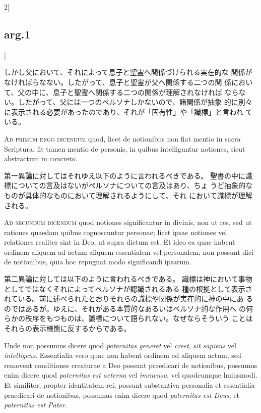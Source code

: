 \documentclass[paper=a4paper,fontsize=10pt,jafontsize=9pt,titlepage]{jlreq}
\begin{document}
\begin{paracol}{2}[\subsection{arg.1}]
\switchcolumn

しかし父において、それによって息子と聖霊へ関係づけられる実在的な
 関係がなければらなない。したがって、息子と聖霊が父へ関係する二つの関
 係において、父の中に、息子と聖霊へ関係する二つの関係が理解されなければ
 ならない。したがって、父には一つのペルソナしかないので、諸関係が抽象
 的に別々に表示される必要があったのであり、それが「固有性」や「識標」と言われ
 ている。

\switchcolumn*[\subsection{ad.1}]

{\scshape Ad primum ergo dicendum} quod, licet de notionibus non fiat mentio in
sacra Scriptura, fit tamen mentio de personis, in quibus intelliguntur
notiones, sicut abstractum in concreto.

\switchcolumn

第一異論に対してはそれゆえ以下のように言われるべきである。
聖書の中に識標についての言及はないがペルソナについての言及はあり、ちょ
 うど抽象的なものが具体的なものにおいて理解されるようにして、それ
 において識標が理解される。

\switchcolumn*[\subsection{ad.2}]

{\scshape Ad secundum dicendum} quod notiones significantur in divinis, non ut
res, sed ut rationes quaedam quibus cognoscuntur personae; licet ipsae
notiones vel relationes realiter sint in Deo, ut supra dictum est. Et
ideo ea quae habent ordinem aliquem ad actum aliquem essentialem vel
personalem, non possunt dici de notionibus, quia hoc repugnat modo
significandi ipsarum.

\switchcolumn

第二異論に対しては以下のように言われるべきである。
識標は神において事物としてではなくそれによってペルソナが認識されるある
 種の根拠として表示されている。前に述べられたとおりそれらの識標や関係が実在的に神の中にあ
 るのではあるが。ゆえに、それがある本質的なあるいはペルソナ的な作用へ
 の何らかの秩序をもつものは、識標について語られない。なぜならそういう
 ことはそれらの表示様態に反するからである。

\switchcolumn*

Unde non possumus dicere quod {\itshape paternitas generet}
vel {\itshape creet}, {\itshape sit sapiens} vel {\itshape intelligens}. Essentialia vero quae non
habent ordinem ad aliquem actum, sed removent conditiones creaturae a
Deo possunt praedicari de notionibus, possumus enim dicere quod
{\itshape paternitas est aeterna} vel {\itshape immensa}, vel quodcumque huiusmodi. Et
similiter, propter identitatem rei, possunt substantiva personalia et
essentialia praedicari de notionibus, possumus enim dicere quod
{\itshape paternitas est Deus}, et {\itshape paternitas est Pater}.


\end{paracol}
\end{document}
